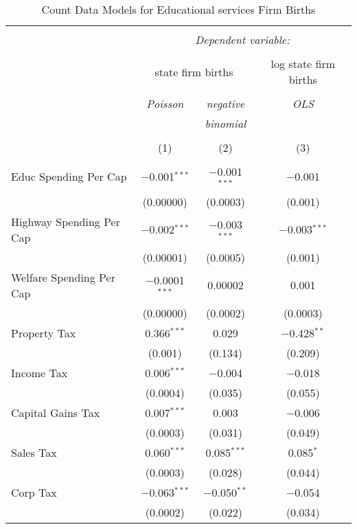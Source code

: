 
\begin{table}[!htbp] \centering 
  \caption{Count Data Models for Educational services Firm Births} 
  \label{} 
\begin{tabular}{@{\extracolsep{5pt}}lccc} 
\\[-1.8ex]\hline 
\hline \\[-1.8ex] 
 & \multicolumn{3}{c}{\textit{Dependent variable:}} \\ 
\cline{2-4} 
\\[-1.8ex] & \multicolumn{2}{c}{state firm births} & log state firm births \\ 
\\[-1.8ex] & \textit{Poisson} & \textit{negative} & \textit{OLS} \\ 
 & \textit{} & \textit{binomial} & \textit{} \\ 
\\[-1.8ex] & (1) & (2) & (3)\\ 
\hline \\[-1.8ex] 
 Educ Spending Per Cap & $-$0.001$^{***}$ & $-$0.001$^{***}$ & $-$0.001 \\ 
  & (0.00000) & (0.0003) & (0.001) \\ 
  Highway Spending Per Cap  & $-$0.002$^{***}$ & $-$0.003$^{***}$ & $-$0.003$^{***}$ \\ 
  & (0.00001) & (0.0005) & (0.001) \\ 
  Welfare Spending Per Cap  & $-$0.0001$^{***}$ & 0.00002 & 0.001 \\ 
  & (0.00000) & (0.0002) & (0.0003) \\ 
  Property Tax & 0.366$^{***}$ & 0.029 & $-$0.428$^{**}$ \\ 
  & (0.001) & (0.134) & (0.209) \\ 
  Income Tax & 0.006$^{***}$ & $-$0.004 & $-$0.018 \\ 
  & (0.0004) & (0.035) & (0.055) \\ 
  Capital Gains Tax & 0.007$^{***}$ & 0.003 & $-$0.006 \\ 
  & (0.0003) & (0.031) & (0.049) \\ 
  Sales Tax & 0.060$^{***}$ & 0.085$^{***}$ & 0.085$^{*}$ \\ 
  & (0.0003) & (0.028) & (0.044) \\ 
  Corp Tax & $-$0.063$^{***}$ & $-$0.050$^{**}$ & $-$0.054 \\ 
  & (0.0002) & (0.022) & (0.034) \\ 

\end{tabular}
\end{table}
